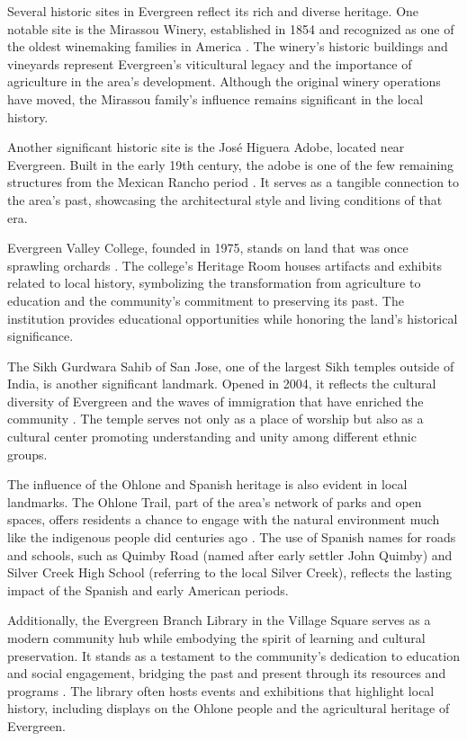 \documentclass[12pt]{article}
\begin{document}
Several historic sites in Evergreen reflect its rich and diverse heritage. One notable site is the Mirassou Winery, established in 1854 and recognized as one of the oldest winemaking families in America \cite{mirassou}. The winery's historic buildings and vineyards represent Evergreen's viticultural legacy and the importance of agriculture in the area's development. Although the original winery operations have moved, the Mirassou family's influence remains significant in the local history.

Another significant historic site is the José Higuera Adobe, located near Evergreen. Built in the early 19th century, the adobe is one of the few remaining structures from the Mexican Rancho period \cite{leccese2003lost}. It serves as a tangible connection to the area's past, showcasing the architectural style and living conditions of that era.

Evergreen Valley College, founded in 1975, stands on land that was once sprawling orchards \cite{evc}. The college's Heritage Room houses artifacts and exhibits related to local history, symbolizing the transformation from agriculture to education and the community's commitment to preserving its past. The institution provides educational opportunities while honoring the land's historical significance.

The Sikh Gurdwara Sahib of San Jose, one of the largest Sikh temples outside of India, is another significant landmark. Opened in 2004, it reflects the cultural diversity of Evergreen and the waves of immigration that have enriched the community \cite{sfgurdwara}. The temple serves not only as a place of worship but also as a cultural center promoting understanding and unity among different ethnic groups.

The influence of the Ohlone and Spanish heritage is also evident in local landmarks. The Ohlone Trail, part of the area's network of parks and open spaces, offers residents a chance to engage with the natural environment much like the indigenous people did centuries ago \cite{parks}. The use of Spanish names for roads and schools, such as Quimby Road (named after early settler John Quimby) and Silver Creek High School (referring to the local Silver Creek), reflects the lasting impact of the Spanish and early American periods.

Additionally, the Evergreen Branch Library in the Village Square serves as a modern community hub while embodying the spirit of learning and cultural preservation. It stands as a testament to the community's dedication to education and social engagement, bridging the past and present through its resources and programs \cite{sjpl}. The library often hosts events and exhibitions that highlight local history, including displays on the Ohlone people and the agricultural heritage of Evergreen.
\end{document}
